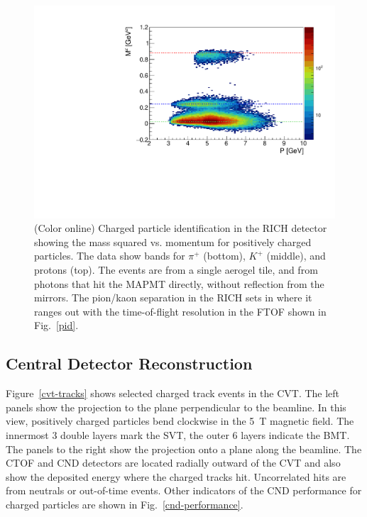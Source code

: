 \documentclass[final,3p,twocolumn]{elsarticle}
\begin{document}
\begin{figure}[ht!]
\centerline{\includegraphics[width=1.0\columnwidth]{mass_min3.pdf}}
\caption{(Color online) Charged particle identification in the RICH detector showing the mass squared vs. momentum for positively
  charged particles. The data show bands for $\pi^+$ (bottom), $K^+$ (middle), and protons (top). The events are
  from a single aerogel tile, and from photons that hit the MAPMT directly, without reflection from the mirrors. The
  pion/kaon separation in the RICH sets in where it ranges out with the time-of-flight resolution in the FTOF shown
  in Fig.~\ref{pid}.}
\label{rich_rec}
\end{figure}

\subsection{Central Detector Reconstruction}

Figure~\ref{cvt-tracks} shows selected charged track events in the CVT. The left panels show the projection to
the plane perpendicular to the beamline. In this view, positively charged particles bend clockwise in the 5~T
magnetic field. The innermost 3 double layers mark the SVT, the outer 6 layers indicate the BMT. The panels to
the right show the projection onto a plane along the beamline. The CTOF and CND detectors are located radially
outward of the CVT and also show the deposited energy where the charged tracks hit. Uncorrelated hits are from
neutrals or out-of-time events. Other indicators of the CND performance for charged particles are shown in
Fig.~\ref{cnd-performance}.  
\end{document}

